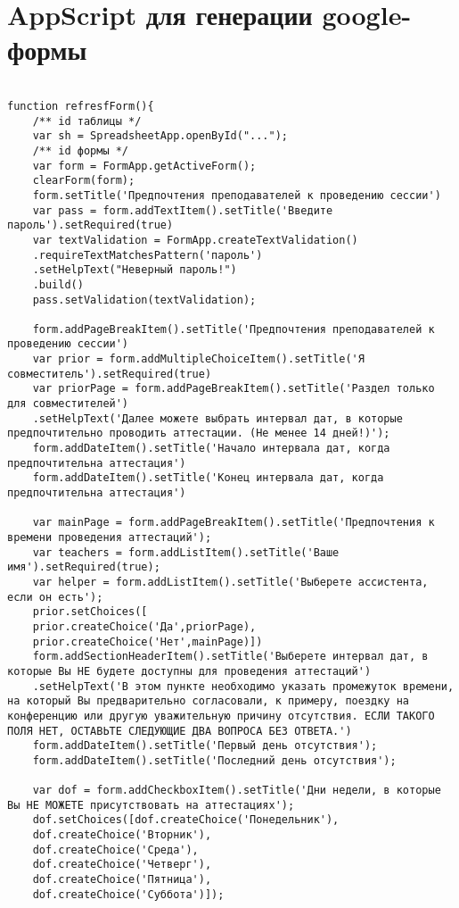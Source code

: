 \chapter{AppScript для генерации google-формы}\label{appendix-appscript}	

\begin{lstlisting}
	
function refresfForm(){
	/** id таблицы */
	var sh = SpreadsheetApp.openById("...");
	/** id формы */
	var form = FormApp.getActiveForm();
	clearForm(form);
	form.setTitle('Предпочтения преподавателей к проведению сессии')
	var pass = form.addTextItem().setTitle('Введите пароль').setRequired(true)
	var textValidation = FormApp.createTextValidation()
	.requireTextMatchesPattern('пароль')
	.setHelpText("Неверный пароль!")
	.build()
	pass.setValidation(textValidation);
	
	form.addPageBreakItem().setTitle('Предпочтения преподавателей к проведению сессии')
	var prior = form.addMultipleChoiceItem().setTitle('Я совместитель').setRequired(true)
	var priorPage = form.addPageBreakItem().setTitle('Раздел только для совместителей')
	.setHelpText('Далее можете выбрать интервал дат, в которые предпочтительно проводить аттестации. (Не менее 14 дней!)');
	form.addDateItem().setTitle('Начало интервала дат, когда предпочтительна аттестация')
	form.addDateItem().setTitle('Конец интервала дат, когда предпочтительна аттестация')
	
	var mainPage = form.addPageBreakItem().setTitle('Предпочтения к времени проведения аттестаций');
	var teachers = form.addListItem().setTitle('Ваше имя').setRequired(true);
	var helper = form.addListItem().setTitle('Выберете ассистента, если он есть');
	prior.setChoices([
	prior.createChoice('Да',priorPage),
	prior.createChoice('Нет',mainPage)])
	form.addSectionHeaderItem().setTitle('Выберете интервал дат, в которые Вы НЕ будете доступны для проведения аттестаций')
	.setHelpText('В этом пункте необходимо указать промежуток времени, на который Вы предварительно согласовали, к примеру, поездку на конференцию или другую уважительную причину отсутствия. ЕСЛИ ТАКОГО ПОЛЯ НЕТ, ОСТАВЬТЕ СЛЕДУЮЩИЕ ДВА ВОПРОСА БЕЗ ОТВЕТА.')
	form.addDateItem().setTitle('Первый день отсутствия');
	form.addDateItem().setTitle('Последний день отсутствия');
	
	var dof = form.addCheckboxItem().setTitle('Дни недели, в которые Вы НЕ МОЖЕТЕ присутствовать на аттестациях');
	dof.setChoices([dof.createChoice('Понедельник'),
	dof.createChoice('Вторник'),
	dof.createChoice('Среда'),
	dof.createChoice('Четверг'),
	dof.createChoice('Пятница'),
	dof.createChoice('Суббота')]);
	

\end{lstlisting}
